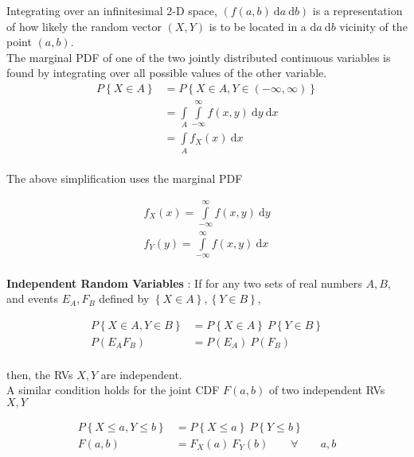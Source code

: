 Integrating over an infinitesimal 2-D space, $ ( f(a, b)\ \mathrm{d}a \ \mathrm{d}b )$ is a representation of how likely the random vector $ (X, Y) $ is to be located in a $ \mathrm{d}a \ \mathrm{d}b $ vicinity of the point $ (a, b) $. \\

The marginal PDF of one of the two jointly distributed continuous variables is found by integrating over all possible values of the other variable.\\

\begin{align}
	P \left\{ X \in A \right\} &= P \left\{ X \in A, Y \in \left( -\infty, \infty \right) \right\} \nonumber \\
	&= \int\limits_{A} \int\limits_{-\infty}^{\infty} f(x,y)\ \mathrm{d}y \  \mathrm{d}x \nonumber \\
	&= \int\limits_{A} f_X (x)\ \mathrm{d}x
\end{align} \\

The above simplification uses the marginal PDF 

\begin{align}
	f_X (x) = \int\limits_{-\infty}^{\infty} f(x,y)\ \mathrm{d}y \\
	f_Y (y) = \int\limits_{-\infty}^{\infty} f(x,y)\ \mathrm{d}x
\end{align} \\

\textbf{Independent Random Variables} : If for any two sets of real numbers $ A, B$, and events $ E_A, F_B $ defined by $ \left\{ X \in A \right\},  \left\{ Y \in B \right\}$,

\begin{align}
	P \left\{ X \in A, Y \in B \right\} &= P \left\{ X \in A \right\} \ P \left\{ Y \in B \right\} \\
	P(E_A F_B) &= P(E_A)\ P(F_B) \nonumber
\end{align} \\

then, the RVs $ X, Y$ are independent.\\

A similar condition holds for the joint CDF $ F(a, b) $ of two independent RVs $ X, Y $

\begin{align}
	P \left\{ X \leq a, Y \leq b \right\} &= P \left\{ X \leq a \right\} \ P \left\{ Y \leq b \right\}  \nonumber \\
	F(a, b) &= F_X(a)\ F_Y(b) \qquad \forall \qquad a, b
\end{align} \\

